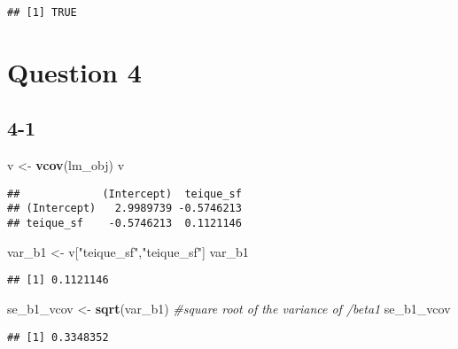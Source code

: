 \documentclass[
]{article}
\newenvironment{Shaded}{\begin{snugshade}}{\end{snugshade}}
\newcommand{\AttributeTok}[1]{\textcolor[rgb]{0.13,0.29,0.53}{#1}}
\newcommand{\CommentTok}[1]{\textcolor[rgb]{0.56,0.35,0.01}{\textit{#1}}}
\newcommand{\DecValTok}[1]{\textcolor[rgb]{0.00,0.00,0.81}{#1}}
\newcommand{\FunctionTok}[1]{\textcolor[rgb]{0.13,0.29,0.53}{\textbf{#1}}}
\newcommand{\NormalTok}[1]{#1}
\newcommand{\OtherTok}[1]{\textcolor[rgb]{0.56,0.35,0.01}{#1}}
\newcommand{\SpecialCharTok}[1]{\textcolor[rgb]{0.81,0.36,0.00}{\textbf{#1}}}
\newcommand{\StringTok}[1]{\textcolor[rgb]{0.31,0.60,0.02}{#1}}
\begin{document}
\begin{verbatim}
## [1] TRUE
\end{verbatim}

\section{Question 4}\label{question-4}

\subsection{4-1}\label{section-18}

\begin{Shaded}
\begin{Highlighting}[]
\NormalTok{v }\OtherTok{\textless{}{-}} \FunctionTok{vcov}\NormalTok{(lm\_obj)}
\NormalTok{v}
\end{Highlighting}
\end{Shaded}

\begin{verbatim}
##             (Intercept)  teique_sf
## (Intercept)   2.9989739 -0.5746213
## teique_sf    -0.5746213  0.1121146
\end{verbatim}

\begin{Shaded}
\begin{Highlighting}[]
\NormalTok{var\_b1 }\OtherTok{\textless{}{-}}\NormalTok{ v[}\StringTok{"teique\_sf"}\NormalTok{,}\StringTok{"teique\_sf"}\NormalTok{]}
\NormalTok{var\_b1}
\end{Highlighting}
\end{Shaded}

\begin{verbatim}
## [1] 0.1121146
\end{verbatim}

\begin{Shaded}
\begin{Highlighting}[]
\NormalTok{se\_b1\_vcov }\OtherTok{\textless{}{-}} \FunctionTok{sqrt}\NormalTok{(var\_b1)      }\CommentTok{\#square root of the variance of /beta1}
\NormalTok{se\_b1\_vcov}
\end{Highlighting}
\end{Shaded}

\begin{verbatim}
## [1] 0.3348352
\end{verbatim}

\begin{Shaded}
\end{Shaded}
\end{document}
